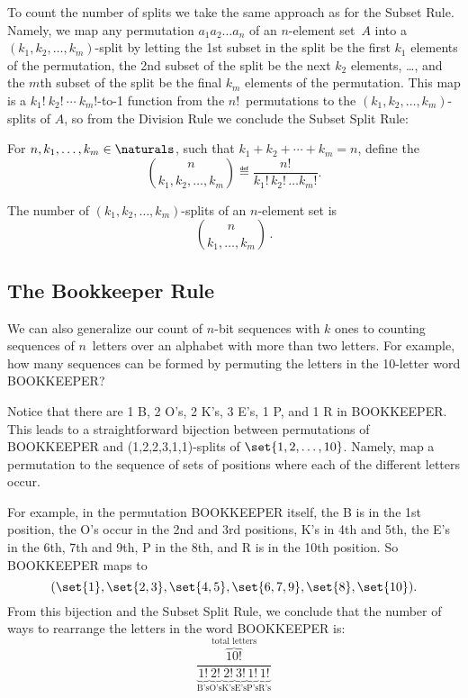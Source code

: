To count the number of splits we take the same approach as for the
Subset Rule.  Namely, we map any permutation $a_1a_2\dots a_n$ of an
$n$-element set~$A$ into a $(k_1,k_2, \dots, k_m)$-split by letting
the 1st subset in the split be the first $k_1$ elements of the
permutation, the 2nd subset of the split be the next $k_2$ elements,
\dots, and the $m$th subset of the split be the final $k_m$ elements
of the permutation.  This map is a
\hbox{$k_1!\ k_2!\ \cdots\ k_m!$-to-1} function from the
$n!$~permutations to the $(k_1,k_2, \dots, k_m)$-splits of $A$, so
from the Division Rule we conclude the Subset Split Rule:

\begin{definition}
For $n,k_1,\dots,k_m \in \naturals$, such that $k_1+k_2+\cdots+k_m = n$,
define the 
\[
\binom{n}{k_1, k_2, \dots, k_m} \eqdef \frac{n!}{k_1!\, k_2!\, \dots k_m!}.
\]
\end{definition}

\begin{rul}
The number of $(k_1,k_2, \dots, k_m)$-splits of an $n$-element set is
\[
\binom{n}{k_1,\dots,k_m}\,.
\]
\end{rul}


\subsection{The Bookkeeper Rule}

We can also generalize our count of $n$-bit sequences
with $k$ ones to counting sequences of $n$~letters over an alphabet
with more than two letters.  For example, how many sequences can be
formed by permuting the letters in the 10-letter word BOOKKEEPER?

Notice that there are 1 B, 2 O's, 2 K's, 3 E's, 1 P, and 1 R in
BOOKKEEPER.  This leads to a straightforward bijection between
permutations of BOOKKEEPER and (1,2,2,3,1,1)-splits of $\set{1, 2,
  \dots, 10}$.  Namely, map a permutation to the sequence of sets of
positions where each of the different letters occur.

For example, in the permutation BOOKKEEPER itself, the B is in the 1st
position, the O's occur in the 2nd and 3rd positions, K's in 4th and 5th,
the E's in the 6th, 7th and 9th, P in the 8th, and R is in the 10th
position. So BOOKKEEPER maps to
\[
(\set{1}, \set{2,3}, \set{4,5}, \set{6,7,9}, \set{8}, \set{10}).
\]
From this bijection and the Subset Split Rule, we conclude that the
number of ways to rearrange the letters in the word BOOKKEEPER is:
\[
\frac{\overbrace{10!}^{\text{total letters}}}{
\underbrace{1!}_{\text{B's}}
\underbrace{2!}_{\text{O's}}
\underbrace{2!}_{\text{K's}}
\underbrace{3!}_{\text{E's}}
\underbrace{1!}_{\text{P's}}
\underbrace{1!}_{\text{R's}}}
\]

